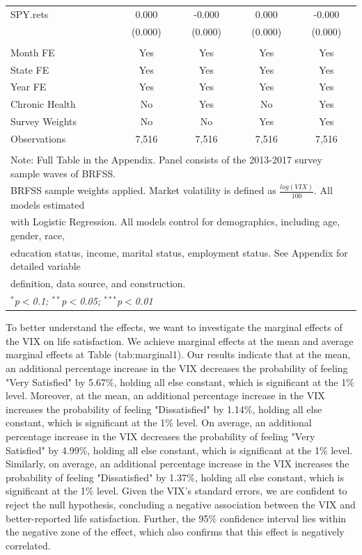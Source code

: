 \documentclass[11pt,a4paper,oldfontcommands]{memoir}
\begin{document}
{\begin{footnotesize}
\begin{longtable}{l*{4}{c}}
SPY.rets            &       0.000\sym{*}  &      -0.000\sym{**} &       0.000\sym{*}  &      -0.000\sym{**} \\
                    &     (0.000)         &     (0.000)         &     (0.000)         &     (0.000)         \\
\hline \\[-1.8ex] 
Month FE  & Yes & Yes & Yes & Yes \\ 
State FE  & Yes & Yes & Yes & Yes \\ 
Year FE  & Yes & Yes & Yes & Yes \\
Chronic Health & No & Yes & No & Yes\\ 
Survey Weights & No & No & Yes & Yes\\ 
Observations  & 7,516 & 7,516 & 7,516 & 7,516 \\ 
\hline \\[-1.8ex] 
\multicolumn{5}{l}{Note: Full Table in the Appendix. Panel consists of the 2013-2017 survey sample waves of BRFSS.}\\
\multicolumn{5}{l}{BRFSS sample weights applied. Market volatility is defined as $\frac{log(VIX)}{100}$. All models estimated}\\
\multicolumn{5}{l}{with Logistic Regression. All models control for demographics, including age, gender, race,}\\
\multicolumn{5}{l}{education status, income, marital status, employment status. See Appendix for detailed variable}\\
\multicolumn{5}{l}{definition, data  source, and construction.}\\
\multicolumn{5}{l}{\textit{$^{*}$p$<$0.1; $^{**}$p$<$0.05; $^{***}$p$<$0.01}} \\ 
\hline\hline
\end{longtable}
\end{footnotesize}

To better understand the effects, we want to investigate the marginal effects of the VIX on life satisfaction. We achieve marginal effects at the mean and average marginal effects at Table \@ref(tab:marginal1). Our results indicate that at the mean, an additional percentage increase in the VIX decreases the probability of feeling "Very Satisfied" by 5.67\%, holding all else constant, which is significant at the 1\% level. Moreover, at the mean, an additional percentage increase in the VIX increases the probability of feeling "Dissatisfied" by 1.14\%, holding all else constant, which is significant at the 1\% level. On average, an additional percentage increase in the VIX decreases the probability of feeling "Very Satisfied" by 4.99\%, holding all else constant, which is significant at the 1\% level. Similarly, on average, an additional percentage increase in the VIX increases the probability of feeling "Dissatisfied" by 1.37\%, holding all else constant, which is significant at the 1\% level. Given the VIX's standard errors, we are confident to reject the null hypothesis, concluding a negative association between the VIX and better-reported life satisfaction. Further, the 95\% confidence interval lies within the negative zone of the effect, which also confirms that this effect is negatively correlated.


}
\end{document}
